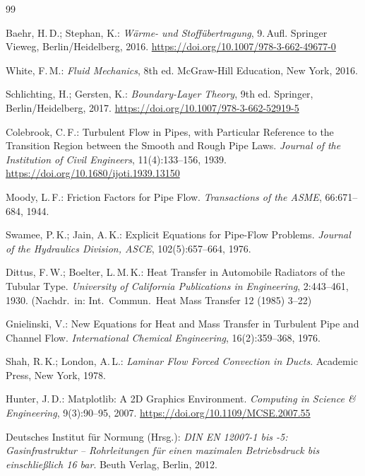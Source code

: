 ﻿\documentclass[12pt,a4paper,twoside]{article}
\theoremstyle{plain}
\theoremstyle{definition}
\theoremstyle{remark}
\begin{document}
\begin{thebibliography}{99}

Baehr, H.\,D.; Stephan, K.:
\textit{Wärme- und Stoffübertragung}, 9.\,Aufl.
Springer Vieweg, Berlin/Heidelberg, 2016.
\url{https://doi.org/10.1007/978-3-662-49677-0}

White, F.\,M.:
\textit{Fluid Mechanics}, 8th ed.
McGraw-Hill Education, New York, 2016.

Schlichting, H.; Gersten, K.:
\textit{Boundary-Layer Theory}, 9th ed.
Springer, Berlin/Heidelberg, 2017.
\url{https://doi.org/10.1007/978-3-662-52919-5}

Colebrook, C.\,F.:
Turbulent Flow in Pipes, with Particular Reference to the Transition Region
between the Smooth and Rough Pipe Laws.
\textit{Journal of the Institution of Civil Engineers}, 11(4):133--156, 1939.
\url{https://doi.org/10.1680/ijoti.1939.13150}

Moody, L.\,F.:
Friction Factors for Pipe Flow.
\textit{Transactions of the ASME}, 66:671--684, 1944.

Swamee, P.\,K.; Jain, A.\,K.:
Explicit Equations for Pipe-Flow Problems.
\textit{Journal of the Hydraulics Division, ASCE}, 102(5):657--664, 1976.

Dittus, F.\,W.; Boelter, L.\,M.\,K.:
Heat Transfer in Automobile Radiators of the Tubular Type.
\textit{University of California Publications in Engineering}, 2:443--461, 1930.
(Nachdr.\ in: Int.\ Commun.\ Heat Mass Transfer 12 (1985) 3--22)

Gnielinski, V.:
New Equations for Heat and Mass Transfer in Turbulent Pipe and Channel Flow.
\textit{International Chemical Engineering}, 16(2):359--368, 1976.

Shah, R.\,K.; London, A.\,L.:
\textit{Laminar Flow Forced Convection in Ducts}.
Academic Press, New York, 1978.

Hunter, J.\,D.:
Matplotlib: A 2D Graphics Environment.
\textit{Computing in Science \& Engineering}, 9(3):90--95, 2007.
\url{https://doi.org/10.1109/MCSE.2007.55}

Deutsches Institut für Normung (Hrsg.):
\textit{DIN EN 12007-1 bis -5: Gasinfrastruktur -- Rohrleitungen für einen
maximalen Betriebsdruck bis einschließlich 16 bar}.
Beuth Verlag, Berlin, 2012.


\end{thebibliography}
\end{document}
